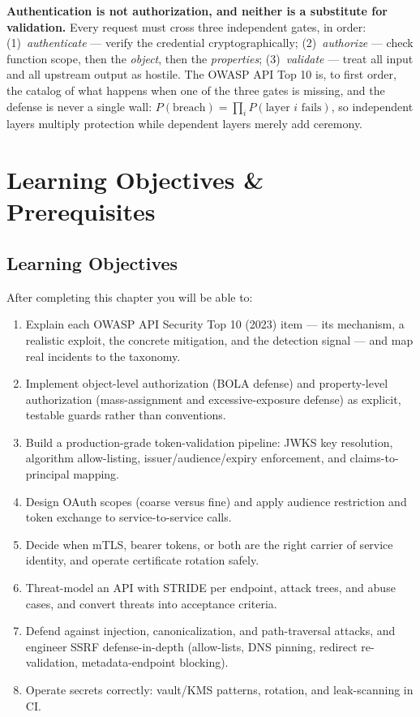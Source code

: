 \begin{keyconceptbox}
\textbf{Authentication is not authorization, and neither is a substitute
for validation.} Every request must cross three independent gates, in order:
(1)~\emph{authenticate} --- verify the credential cryptographically;
(2)~\emph{authorize} --- check function scope, then the \emph{object}, then
the \emph{properties}; (3)~\emph{validate} --- treat all input and all
upstream output as hostile. The OWASP API Top 10 is, to first order, the
catalog of what happens when one of the three gates is missing, and the
defense is never a single wall: $P(\text{breach}) = \prod_i P(\text{layer } i
\text{ fails})$, so independent layers multiply protection while dependent
layers merely add ceremony.
\end{keyconceptbox}

\section{Learning Objectives \& Prerequisites}
\label{sec:ch16-objectives}

\subsection*{Learning Objectives}

After completing this chapter you will be able to:

\begin{enumerate}[itemsep=0.3em]
  \item Explain each OWASP API Security Top 10 (2023) item --- its
        mechanism, a realistic exploit, the concrete mitigation, and the
        detection signal --- and map real incidents to the taxonomy.
  \item Implement object-level authorization (BOLA defense) and
        property-level authorization (mass-assignment and excessive-exposure
        defense) as explicit, testable guards rather than conventions.
  \item Build a production-grade token-validation pipeline: JWKS key
        resolution, algorithm allow-listing, issuer/audience/expiry
        enforcement, and claims-to-principal mapping.
  \item Design OAuth scopes (coarse versus fine) and apply audience
        restriction and token exchange to service-to-service calls.
  \item Decide when mTLS, bearer tokens, or both are the right carrier of
        service identity, and operate certificate rotation safely.
  \item Threat-model an API with STRIDE per endpoint, attack trees, and
        abuse cases, and convert threats into acceptance criteria.
  \item Defend against injection, canonicalization, and path-traversal
        attacks, and engineer SSRF defense-in-depth (allow-lists, DNS
        pinning, redirect re-validation, metadata-endpoint blocking).
  \item Operate secrets correctly: vault/KMS patterns, rotation, and
        leak-scanning in CI.
\end{enumerate}

